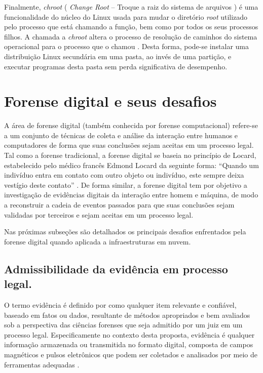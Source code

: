 Finalmente, \textit{chroot} ( \textit{Change Root} -- Troque a raiz do sistema de arquivos ) é uma funcionalidade do núcleo do Linux usada para mudar o diretório \textit{root} utilizado pelo processo que está chamando a função, bem como por todos os seus processos filhos. 
%
A chamada a \textit{chroot} altera o processo de resolução de caminhos do sistema operacional para o processo que o chamou \cite{UnixManPagesChRoot}.
%
Desta forma, pode-se instalar uma distribuição Linux secundária em uma pasta, ao invés de uma partição, e executar programas desta pasta sem perda significativa de desempenho.


\section{Forense digital e seus desafios}
\label{sec:forensedigital}


A área de forense digital (também conhecida por forense computacional) refere-se a um conjunto de técnicas de coleta e análise da interação entre humanos e computadores de forma que suas conclusões sejam aceitas em um processo legal.
%
Tal como a forense tradicional, a forense digital se baseia no princípio de Locard, estabelecido pelo médico francês Edmond Locard da seguinte forma: ``Quando um indivíduo entra em contato com outro objeto ou indivíduo, este sempre deixa vestígio deste contato'' \cite[p.~31]{Ramos:2011}.
%
De forma similar, a forense digital tem por objetivo a investigação de evidências digitais da interação entre homem e máquina, de modo a reconstruir a cadeia de eventos passados para que suas conclusões sejam validadas por terceiros e sejam aceitas em um processo legal.
 

Nas próximas subseções são detalhados os principais desafios enfrentados pela forense digital quando aplicada a infraestruturas em nuvem.

\subsection{Admissibilidade da evidência em processo legal.}
\label{sec:credibilidadeaceitabilidadeevidencia}

O termo evidência é definido por \cite[p.~1]{LuisDigitalChainOfCustody:2016} como qualquer item relevante e confiável, baseado em fatos ou dados, resultante de métodos apropriados e bem avaliados sob a perspectiva das ciências forenses que seja admitido por um juiz em um processo legal.
%
Especificamente no contexto desta proposta, evidência é qualquer informação armazenada ou transmitida no formato digital, composta de campos magnéticos e pulsos eletrônicos que podem ser coletados e analisados por meio de ferramentas adequadas \cite[p.~38]{Ramos:2011}.
%

